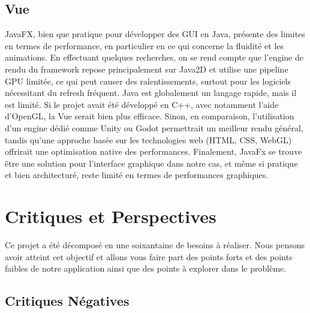 \documentclass{article}
\begin{document}
\subsection{Vue}
JavaFX, bien que pratique pour développer des GUI en Java, présente des limites en termes de performance, en particulier en ce qui concerne
la fluidité et les animations. En effectuant quelques recherches, on se rend compte que l'engine de rendu du framework repose principalement
sur Java2D et utilise une pipeline GPU limitée, ce qui peut causer des ralentissements, surtout pour les logiciels nécessitant du refresh
fréquent. Java est globalement un langage rapide, mais il est limité. Si le projet avait été développé en C++, avec notamment
l'aide d'OpenGL, la Vue serait bien plus efficace. Sinon, en comparaison, l'utilisation d'un engine dédié comme Unity ou Godot permettrait
un meilleur rendu général, tandis qu'une approche basée sur les technologies web (HTML, CSS, WebGL) offrirait une
optimisation native des performances. Finalement, JavaFx se trouve être une solution pour l'interface graphique dans notre cas, et même si
pratique et bien architecturé, reste limité en termes de performances graphiques.

\section{Critiques et Perspectives}
Ce projet a été décomposé en une soixantaine de besoins à réaliser. Nous pensons avoir atteint cet objectif et allons vous faire part 
des points forts et des points faibles de notre application ainsi que des points à explorer dans le problème.
\subsection{Critiques Négatives}
\end{document}
